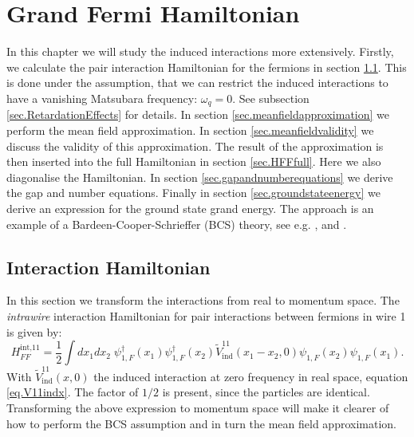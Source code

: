 
\chapter{Grand Fermi Hamiltonian} %

\label{Chapter4} %


In this chapter we will study the induced interactions more extensively. Firstly, we calculate the pair interaction Hamiltonian for the fermions in section \ref{sec.HFFint}. This is done under the assumption, that we can restrict the induced interactions to have a vanishing Matsubara frequency: $\omega_q = 0$. See subsection \ref{sec.RetardationEffects} for details. In section \ref{sec.meanfieldapproximation} we perform the mean field approximation. In section \ref{sec.meanfieldvalidity} we discuss the validity of this approximation. The result of the approximation is then inserted into the full Hamiltonian in section \ref{sec.HFFfull}. Here we also diagonalise the Hamiltonian. In section \ref{sec.gapandnumberequations} we derive the gap and number equations. Finally in section \ref{sec.groundstateenergy} we derive an expression for the ground state grand energy. The approach is an example of a Bardeen-Cooper-Schrieffer (BCS) theory, see e.g. \cite[pp. 359-369]{PlischkeStatPhys}, \cite[pp. 153-163]{LandauStatPhys2} and \cite[chapter 3]{Tinkham}.   

\section{Interaction Hamiltonian} \label{sec.HFFint}
In this section we transform the interactions from real to momentum space. The \textit{intrawire} interaction Hamiltonian for pair interactions between fermions in wire 1 is given by:
\begin{equation}
H^\text{int,11}_{FF} = \frac{1}{2}\int dx_1dx_2\; \psi^\dagger_{1,F}(x_1)\psi^\dagger_{1,F}(x_2)\tilde{V}^{11}_{\text{ind}}(x_1 - x_2, 0) \psi_{1,F}(x_2) \psi_{1,F}(x_1).
\label{eq.HFF11intdef}
\end{equation}
With $\tilde{V}^{11}_\text{ind}(x,0)$ the induced interaction at zero frequency in real space, equation \eqref{eq.V11indx}. The factor of $1/2$ is present, since the particles are identical. Transforming the above expression to momentum space will make it clearer of how to perform the BCS assumption and in turn the mean field approximation. 

